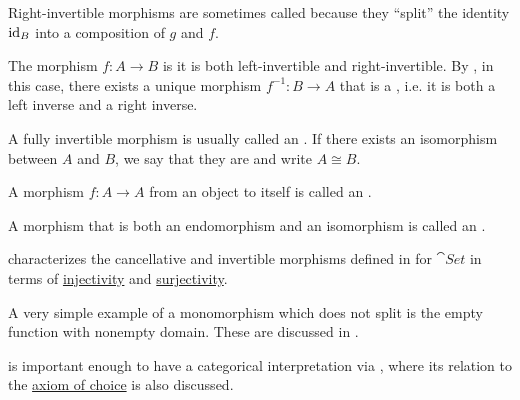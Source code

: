 \begin{definition}
\begin{thmenum}
    Right-invertible morphisms are sometimes called  because they \enquote{split} the identity \( \operatorname{id}_B \) into a composition of \( g \) and \( f \).

     The morphism \( f: A \to B \) is  it is both left-invertible and right-invertible. By , in this case, there exists a unique morphism \( f^{-1}: B \to A \) that is a , i.e. it is both a left inverse and a right inverse.

    A fully invertible morphism is usually called an . If there exists an isomorphism between \( A \) and \( B \), we say that they are  and write \( A \cong B \).

     A morphism \( f: A \to A \) from an object to itself is called an .

     A morphism that is both an endomorphism and an isomorphism is called an .
  \end{thmenum}
\end{definition}

\begin{example}\label{ex:def:morphism_invertibility}
   characterizes the cancellative and invertible morphisms defined in  for \hyperref[def:category_of_small_sets]{\( \cat{Set} \)} in terms of \hyperref[def:function_invertibility/injective]{injectivity} and \hyperref[def:function_invertibility/injective]{surjectivity}.

  A very simple example of a monomorphism which does not split is the empty function with nonempty domain. These are discussed in .

   is important enough to have a categorical interpretation via , where its relation to the \hyperref[def:zfc/choice]{axiom of choice} is also discussed.
\end{example}

